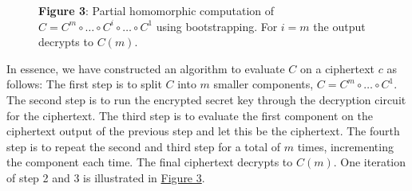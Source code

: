 \begin{figure}
    \centering
    \hypertarget{fig:Bootstrapping}{}
    
    \caption*{\textbf{Figure 3}: Partial homomorphic computation of $C = C^m \circ \dots \circ C^i \circ \dots \circ C^1$ using bootstrapping. For $i = m$ the output decrypts to $C(m)$.}
\end{figure}

In essence, we have constructed an algorithm to evaluate $C$ on a ciphertext $c$ as follows: The first step is to split $C$ into $m$ smaller components, $C = C^m \circ \dots \circ C^1$. The second step is to run the encrypted secret key through the decryption circuit for the ciphertext. The third step is to evaluate the first component on the ciphertext output of the previous step and let this be the ciphertext. The fourth step is to repeat the second and third step for a total of $m$ times, incrementing the component each time. The final ciphertext decrypts to $C(m)$. One iteration of step 2 and 3 is illustrated in \hyperlink{fig:Bootstrapping}{Figure 3}.

